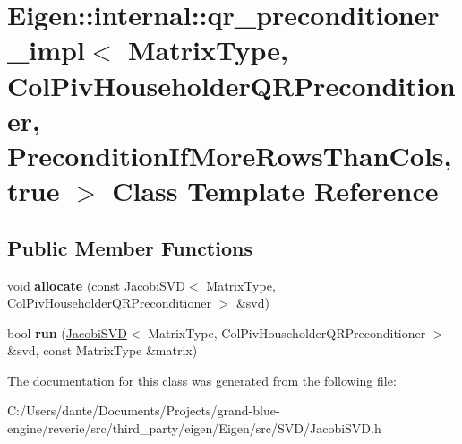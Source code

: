 \hypertarget{class_eigen_1_1internal_1_1qr__preconditioner__impl_3_01_matrix_type_00_01_col_piv_householder_q4429b16903ed71549d5aafc43959c2c2}{}\section{Eigen\+::internal\+::qr\+\_\+preconditioner\+\_\+impl$<$ Matrix\+Type, Col\+Piv\+Householder\+Q\+R\+Preconditioner, Precondition\+If\+More\+Rows\+Than\+Cols, true $>$ Class Template Reference}
\label{class_eigen_1_1internal_1_1qr__preconditioner__impl_3_01_matrix_type_00_01_col_piv_householder_q4429b16903ed71549d5aafc43959c2c2}
\subsection*{Public Member Functions}
\begin{DoxyCompactItemize}
\item 
\mbox{\label{class_eigen_1_1internal_1_1qr__preconditioner__impl_3_01_matrix_type_00_01_col_piv_householder_q4429b16903ed71549d5aafc43959c2c2_a528c2a55d53add25075f8ae1adda891a}} 
void {\bfseries allocate} (const \mbox{\hyperlink{class_eigen_1_1_jacobi_s_v_d}{Jacobi\+S\+VD}}$<$ Matrix\+Type, Col\+Piv\+Householder\+Q\+R\+Preconditioner $>$ \&svd)
\item 
\mbox{\label{class_eigen_1_1internal_1_1qr__preconditioner__impl_3_01_matrix_type_00_01_col_piv_householder_q4429b16903ed71549d5aafc43959c2c2_a901d20a4f40e2254534e8560bd8219bd}} 
bool {\bfseries run} (\mbox{\hyperlink{class_eigen_1_1_jacobi_s_v_d}{Jacobi\+S\+VD}}$<$ Matrix\+Type, Col\+Piv\+Householder\+Q\+R\+Preconditioner $>$ \&svd, const Matrix\+Type \&matrix)
\end{DoxyCompactItemize}


The documentation for this class was generated from the following file\+:\begin{DoxyCompactItemize}
\item 
C\+:/\+Users/dante/\+Documents/\+Projects/grand-\/blue-\/engine/reverie/src/third\+\_\+party/eigen/\+Eigen/src/\+S\+V\+D/Jacobi\+S\+V\+D.\+h\end{DoxyCompactItemize}
